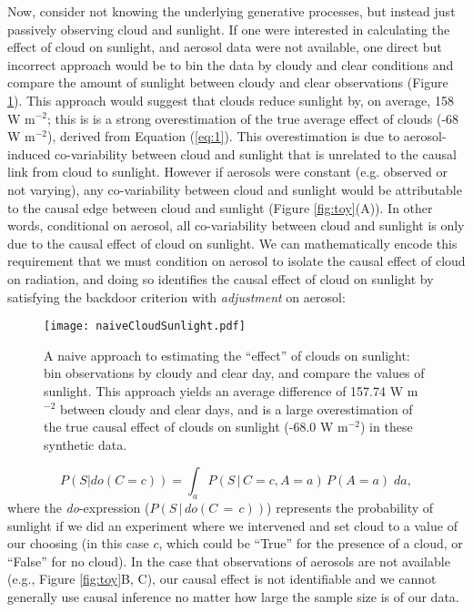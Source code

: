 \documentclass[12pt]{article}
\begin{document}
Now, consider not knowing the underlying generative processes, but
instead just passively observing cloud and sunlight. If one were
interested in calculating the effect of cloud on sunlight, and aerosol
data were not available, one direct but incorrect approach would be to bin the data
by cloudy and clear conditions and compare the amount of sunlight
between cloudy and clear observations (Figure
\ref{fig:naive-cloud-sunlight}). This approach would suggest that
clouds reduce sunlight by, on average, 158 W m$^{-2}$; this is is a
strong overestimation of the true average effect of clouds (-68 W
m$^{-2}$), derived from Equation (\ref{eq:1}). This overestimation is
due to aerosol-induced co-variability between cloud and sunlight that
is unrelated to the causal link from cloud to sunlight. However if
aerosols were constant (e.g. observed or not varying), any
co-variability between cloud and sunlight would be attributable to the
causal edge between cloud and sunlight (Figure \ref{fig:toy}(A)). In
other words, conditional on aerosol, all co-variability between cloud
and sunlight is only due to the causal effect of cloud on sunlight.
We can mathematically encode this requirement that we must condition
on aerosol to isolate the causal effect of cloud on radiation, and
doing so identifies the causal effect of cloud on sunlight by
satisfying the backdoor criterion with \textit{adjustment} on aerosol:

\begin{figure} \texttt{[image: naiveCloudSunlight.pdf]}
  \caption{A naive approach to estimating the ``effect'' of clouds on
    sunlight: bin observations by cloudy and clear day, and compare the
    values of sunlight. This approach yields an average difference of
    157.74 W m$^{-2}$ between cloudy and clear days, and is a large
    overestimation of the true causal effect of clouds on sunlight (-68.0
    W m$^{-2}$) in these synthetic data.}
  \label{fig:naive-cloud-sunlight}
\end{figure}

\begin{equation} P(S | do(C = c)) = \int_{a} P(S \, | \, C = c, A=a)
  \, P(A=a) \; da,
  \label{eq:3}
\end{equation} where the \textit{do}-expression ($P(S \, | \, do(C\, = \,c))$) represents the probability of sunlight
if we did an experiment where we intervened and set cloud to a value
of our choosing (in this case $c$, which could be ``True'' for the
presence of a cloud, or ``False'' for no cloud). In the case that observations of aerosols are not available (e.g.,
Figure \ref{fig:toy}B, C), our causal effect is not identifiable and
we cannot generally use causal inference no matter how large the
sample size is of our data.
\end{document}
